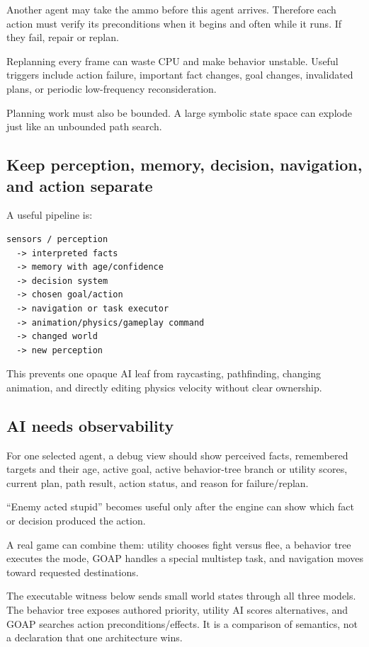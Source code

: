 Another agent may take the ammo before this agent arrives. Therefore each action must verify its preconditions when it begins and often while it runs. If they fail, repair or replan.

Replanning every frame can waste CPU and make behavior unstable. Useful triggers include action failure, important fact changes, goal changes, invalidated plans, or periodic low-frequency reconsideration.

Planning work must also be bounded. A large symbolic state space can explode just like an unbounded path search.

\subsection{Keep perception, memory, decision, navigation, and action separate}\label{06-engine-ii-ch047-keep-perception-memory-decision-navigation-and-action-separate}

A useful pipeline is:

\begin{verbatim}
sensors / perception
  -> interpreted facts
  -> memory with age/confidence
  -> decision system
  -> chosen goal/action
  -> navigation or task executor
  -> animation/physics/gameplay command
  -> changed world
  -> new perception
\end{verbatim}

This prevents one opaque AI leaf from raycasting, pathfinding, changing animation, and directly editing physics velocity without clear ownership.

\subsection{AI needs observability}\label{06-engine-ii-ch047-ai-needs-observability}

For one selected agent, a debug view should show perceived facts, remembered targets and their age, active goal, active behavior-tree branch or utility scores, current plan, path result, action status, and reason for failure/replan.

``Enemy acted stupid'' becomes useful only after the engine can show which fact or decision produced the action.

A real game can combine them: utility chooses fight versus flee, a behavior tree executes the mode, GOAP handles a special multistep task, and navigation moves toward requested destinations.

The executable witness below sends small world states through all three models. The behavior tree exposes authored priority, utility AI scores alternatives, and GOAP searches action preconditions/effects. It is a comparison of semantics, not a declaration that one architecture wins.

